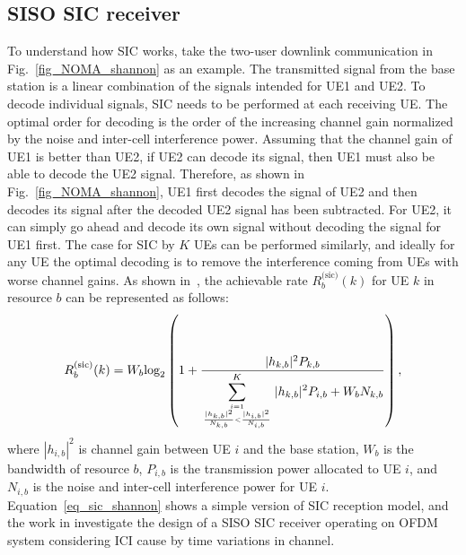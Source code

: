 \subsection{SISO SIC receiver}
To understand how SIC works, take the two-user downlink communication in Fig.~\ref{fig_NOMA_shannon} as an example. The transmitted signal from the base station is a linear combination of the signals intended for UE1 and UE2. To decode individual signals, SIC needs to be performed at
each receiving UE. 
The optimal order for decoding is the order of the increasing channel gain normalized by the noise and inter-cell interference power. 
Assuming that the channel gain of UE1 is better than UE2, if UE2 can decode its signal, then UE1 must also be able to decode the UE2 signal.
Therefore, as shown in Fig.~\ref{fig_NOMA_shannon}, UE1 first decodes the signal of UE2 and then decodes its signal after the decoded
UE2 signal has been subtracted. 
For UE2, it can simply go ahead and decode its own signal without decoding the signal for UE1 first.
The case for SIC by $K$ UEs can be performed similarly, and ideally for any UE
the optimal decoding is to remove the interference coming from UEs with worse channel gains.
As shown in~\cite{cite_docomo1}, 
the achievable rate $R_b^{\text{(sic)}}(k)$ for UE $k$ in resource $b$ can be represented as follows:
\begin{equation}
\label{eq_sic_shannon}
R_b^{\text{(sic)}}(k)=W_b \text{log}_2 \left(1+\frac{|h_{k, b}|^2 P_{k, b}}{\displaystyle\sum^K_{{i=1} \atop {\frac{|h_{k, b}|^2}{N_{k, b}} < \frac{|h_{i, b}|^2}{N_{i, b}}}} |h_{k, b}|^2 P_{i, b} +W_b N_{k, b}} \right),
\end{equation}
where $|h_{i, b}|^2$ is channel gain between UE $i$ and the base station, $W_b$ is the bandwidth of resource $b$, $P_{i, b}$ is the transmission power allocated to UE $i$, and $N_{i, b}$ is the noise and inter-cell interference power for UE $i$.
Equation~\ref{eq_sic_shannon} shows a simple version of SIC reception model,
and the work in \cite{A_Successive_Interference_Cancellation_Scheme_for_an_OFDM_system}
investigate the design of a SISO SIC receiver operating on OFDM system
considering ICI cause by time variations in channel.

